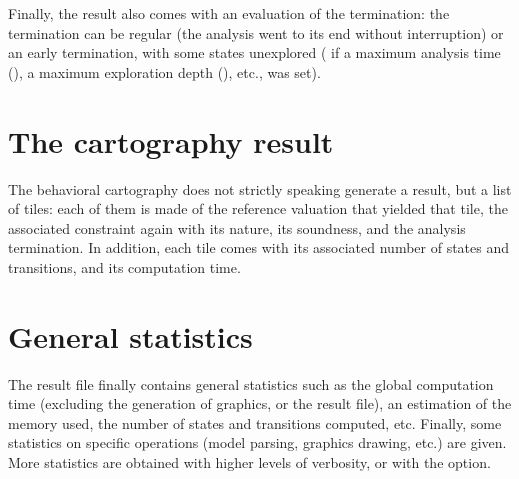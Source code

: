 

Finally, the result also comes with an evaluation of the termination: the termination can be regular (the analysis went to its end without interruption) or an early termination, with some states unexplored (\eg{} if a maximum analysis time (), a maximum exploration depth (), etc., was set).


\section{The cartography result}

The behavioral cartography does not strictly speaking generate a result, but a list of tiles: each of them is made of the reference valuation that yielded that tile, the associated constraint again with its nature, its soundness, and the analysis termination.
In addition, each tile comes with its associated number of states and transitions, and its computation time.



\section{General statistics}

The result file finally contains general statistics such as the global computation time (excluding the generation of graphics, or the result file), an estimation of the memory used, the number of states and transitions computed, etc.
Finally, some statistics on specific operations (model parsing, graphics drawing, etc.) are given.
More statistics are obtained with higher levels of verbosity, or with the  option.

